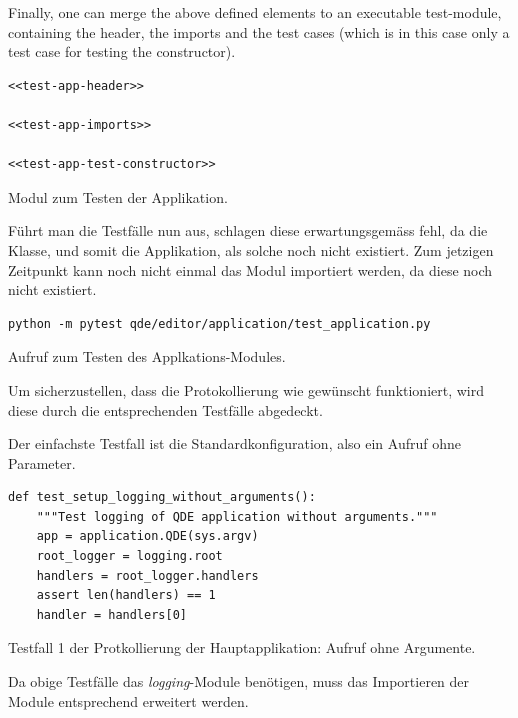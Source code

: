 \documentclass[10pt, openright, notitlepage]{scrreprt}
\begin{document}
Finally, one can merge the above defined elements to an executable test-module,
containing the header, the imports and the test cases (which is in this case
only a test case for testing the constructor).

\begin{listing}[H]
\begin{verbatim}
<<test-app-header>>

<<test-app-imports>>

<<test-app-test-constructor>>
\end{verbatim}
\caption{Modul zum Testen der Applikation.}
\end{listing}

Führt man die Testfälle nun aus, schlagen diese erwartungsgemäss fehl, da die
Klasse, und somit die Applikation, als solche noch nicht existiert. Zum jetzigen
Zeitpunkt kann noch nicht einmal das Modul importiert werden, da diese noch
nicht existiert.

\begin{listing}[H]
\begin{verbatim}
python -m pytest qde/editor/application/test_application.py
\end{verbatim}
\caption{Aufruf zum Testen des Applkations-Modules.}
\end{listing}

Um sicherzustellen, dass die Protokollierung wie gewünscht funktioniert, wird
diese durch die entsprechenden Testfälle abgedeckt.

Der einfachste Testfall ist die Standardkonfiguration, also ein Aufruf ohne
Parameter.

\begin{listing}[H]
\begin{verbatim}
def test_setup_logging_without_arguments():
    """Test logging of QDE application without arguments."""
    app = application.QDE(sys.argv)
    root_logger = logging.root
    handlers = root_logger.handlers
    assert len(handlers) == 1
    handler = handlers[0]
\end{verbatim}
\caption{\label{test-app-test-logging-default}
Testfall 1 der Protkollierung der Hauptapplikation: Aufruf ohne Argumente.}
\end{listing}

Da obige Testfälle das \emph{logging}-Module benötigen, muss das Importieren der Module
entsprechend erweitert werden.
\end{document}
